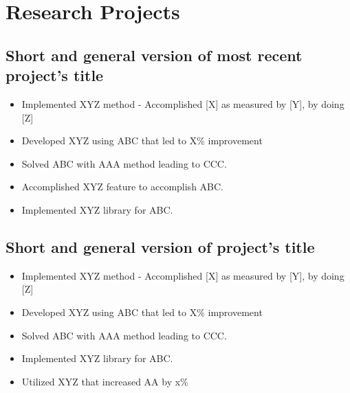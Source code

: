 \documentclass[11pt]{article}
\begin{document}
    \section{Research Projects}
    \subsection{Short and general version of most recent project's title} %
    \begin{itemize}
        \item[\checkmark] Implemented XYZ method - Accomplished [X] as measured by [Y], by doing [Z] 
        \item[\checkmark] Developed XYZ using ABC that led to X\% improvement 
        \item[\checkmark] Solved ABC with AAA method leading to CCC.
        \item[\checkmark] Accomplished XYZ feature to accomplish ABC.
        \item[\checkmark] Implemented XYZ library for ABC.
    \end{itemize}
    \subsection{Short and general version of project's title} %
    \begin{itemize}
        \item[\checkmark] Implemented XYZ method - Accomplished [X] as measured by [Y], by doing [Z] 
        \item[\checkmark] Developed XYZ using ABC that led to X\% improvement 
        \item[\checkmark] Solved ABC with AAA method leading to CCC.
        \item[\checkmark] Implemented XYZ library for ABC.
        \item[\checkmark] Utilized XYZ that increased AA by x\%
    \end{itemize}
\end{document}
